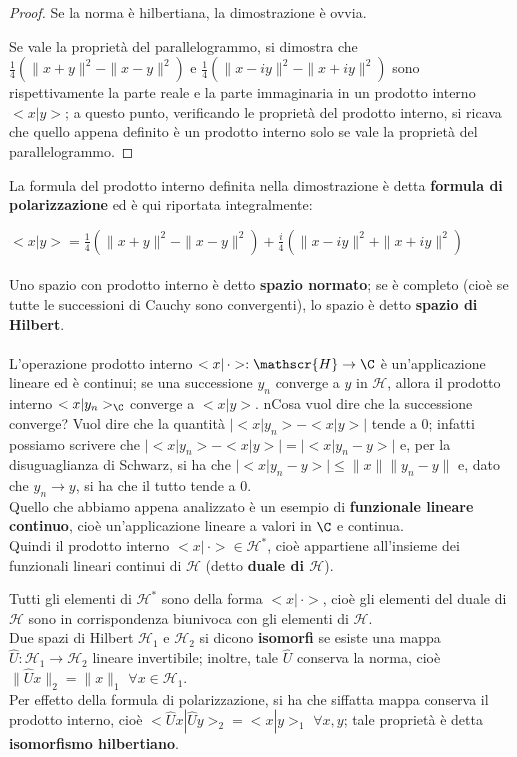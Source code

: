 \begin{proof} Se la norma è hilbertiana, la dimostrazione è ovvia.

Se vale la proprietà del parallelogrammo, si dimostra che $\frac{1}{4} (\|x+y\|^2-\|x-y\|^2)$ e  $\frac{1}{4} (\|x-iy\|^2-\|x+iy\|^2)$ sono rispettivamente la parte reale e la parte immaginaria in un prodotto interno $<x|y>$; a questo punto, verificando le proprietà del prodotto interno, si ricava che quello appena definito è un prodotto interno solo se vale la proprietà del parallelogrammo.

\end{proof}

La formula del prodotto interno definita nella dimostrazione è detta \textbf{formula di polarizzazione} ed è qui riportata integralmente:

$<x|y>= \frac{1}{4} (\|x+y\|^2-\|x-y\|^2)+ \frac{i}{4} (\|x-iy\|^2+\|x+iy\|^2)$ \\
\\
Uno spazio con prodotto interno è detto \textbf{spazio normato}; se è completo (cioè se tutte le successioni di Cauchy sono convergenti), lo spazio è detto \textbf{spazio di Hilbert}.
\\
\\
L'operazione prodotto interno $<x|\, \cdot>:\mathscr{H} \to \C$ è un'applicazione lineare ed è continui; se una successione $y_n$ converge a $y$ in $\mathscr{H}$, allora il prodotto interno $<x|y_n>_{\C}$ converge a $<x|y>$. nCosa vuol dire che la successione converge? Vuol dire che la quantità $|<x|y_n>-<x|y>|$ tende a $0$; infatti possiamo scrivere che $|<x|y_n>-<x|y>|=|<x|y_n-y>|$ e, per la disuguaglianza di Schwarz, si ha che $|<x|y_n-y>| \leq \|x\| \|y_n-y\|$ e, dato che $y_n \to y$, si ha che il tutto tende a $0$. \\Quello che abbiamo appena analizzato è un esempio di \textbf{funzionale lineare continuo}, cioè un'applicazione lineare a valori in $\C$ e continua. \\Quindi il prodotto interno $<x|\, \cdot> \in \mathscr{H}^*$, cioè appartiene all'insieme dei funzionali lineari continui di $\mathscr{H}$ (detto \textbf{duale di $\mathscr{H}$}).

Tutti gli elementi di $\mathscr{H}^*$ sono della forma $<x|\, \cdot>$, cioè gli elementi del duale di $\mathscr{H}$ sono in corrispondenza biunivoca con gli elementi di $\mathscr{H}$.
\\
Due spazi di Hilbert $\mathscr{H}_1$ e $\mathscr{H}_2$ si dicono \textbf{isomorfi} se esiste una mappa $\hat{U}:\mathscr{H}_1 \to \mathscr{H}_2$ lineare invertibile; inoltre, tale $\hat{U}$ conserva la norma, cioè $\|\hat{U} x \|_2=\|x\|_1$ $\forall x \in \mathscr{H}_1$. \\Per effetto della formula di polarizzazione, si ha che siffatta mappa conserva il prodotto interno, cioè $<\hat{U} x|\hat{U}y>_2=<x|y>_1$ $\forall x,y$; tale proprietà è detta \textbf{isomorfismo hilbertiano}.

